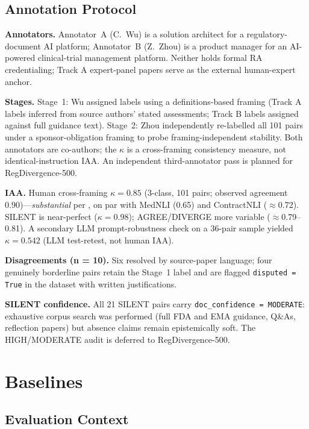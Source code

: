 \documentclass[manuscript]{acmart}
\begin{document}
\subsection{Annotation Protocol}
\label{sec:annotation}

\textbf{Annotators.} Annotator~A (C.~Wu) is a solution architect for a
regulatory-document AI platform; Annotator~B (Z.~Zhou) is a product manager for
an AI-powered clinical-trial management platform. Neither holds formal RA
credentialing; Track A expert-panel papers serve as the external human-expert
anchor.

\textbf{Stages.} Stage~1: Wu assigned labels using a definitions-based framing
(Track A labels inferred from source authors' stated assessments; Track B labels
assigned against full guidance text). Stage~2: Zhou independently re-labelled
all 101 pairs under a sponsor-obligation framing to probe framing-independent
stability. Both annotators are co-authors; the $\kappa$ is a cross-framing
consistency measure, not identical-instruction IAA. An independent
third-annotator pass is planned for RegDivergence-500.

\textbf{IAA.} Human cross-framing $\kappa = 0.85$ (3-class, 101 pairs;
observed agreement 0.90)---\textit{substantial} per \citet{landis1977kappa},
on par with MedNLI (0.65) and ContractNLI ($\approx$0.72). SILENT is
near-perfect ($\kappa = 0.98$); AGREE/DIVERGE more variable ($\approx$0.79--0.81).
A secondary LLM prompt-robustness check on a 36-pair sample yielded
$\kappa = 0.542$ (LLM test-retest, not human IAA).

\textbf{Disagreements (n = 10).} Six resolved by source-paper language; four
genuinely borderline pairs retain the Stage~1 label and are flagged
\texttt{disputed = True} in the dataset with written justifications.

\textbf{SILENT confidence.} All 21 SILENT pairs carry
\texttt{doc\_confidence = MODERATE}: exhaustive corpus search was performed
(full FDA and EMA guidance, Q\&As, reflection papers) but absence claims remain
epistemically soft. The HIGH/MODERATE audit is deferred to RegDivergence-500.

\section{Baselines}

\subsection{Evaluation Context}
\label{sec:eval_context}
\end{document}
